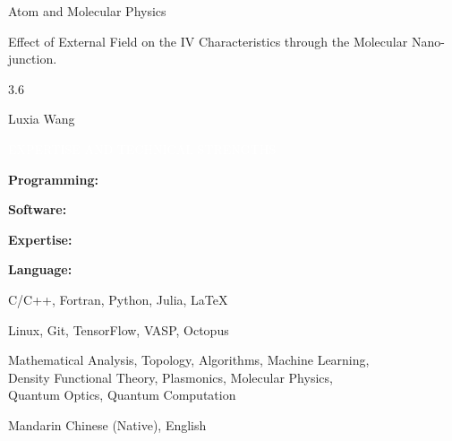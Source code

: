 \documentclass[12pt,a4paper,utf8]{report}
\begin{document}
    \begin{minipage}[t]{11cm}
        Atom and Molecular Physics\par
        Effect of External Field on the IV Characteristics through the Molecular Nano-junction.\par
        3.6\par
        Luxia Wang\par
    \end{minipage}\par
\vspace{0.4cm}

\begin{minipage}[t]{16cm}
    \begin{snugshade}{\textcolor{white}{\textsf{\quad 
        EXPERTISE AND TECHNICAL STRENGTHS
    \qquad}}}\end{snugshade}
\end{minipage}\par
\vspace{0.2cm}
    \begin{minipage}[t]{4cm}
        \qquad \textbf{Programming:}\par
        \qquad \textbf{Software:}\par
        \qquad \textbf{Expertise:}\par
        \qquad \par
        \qquad \par
        \qquad \textbf{Language:}\par
    \end{minipage}
    \begin{minipage}[t]{14cm}
        C/C++, Fortran, Python, Julia, \LaTeX \par
        Linux, Git, TensorFlow, VASP, Octopus\par
        Mathematical Analysis, Topology, Algorithms, Machine Learning, \\
        Density Functional Theory, Plasmonics, Molecular Physics, \\
        Quantum Optics, Quantum Computation \par
        Mandarin Chinese (Native), English \par
    \end{minipage}\par
\vspace{0.4cm}
\end{document}
